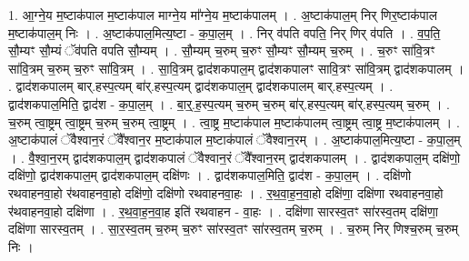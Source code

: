 \documentclass[17pt]{extarticle}
\begin{document}
1. आ॒ग्ने॒य म॒ष्टाक॑पाल म॒ष्टाक॑पाल माग्ने॒य मा᳚ग्ने॒य म॒ष्टाक॑पालम् । . अ॒ष्टाक॑पाल॒म् निर् णिर॒ष्टाक॑पाल म॒ष्टाक॑पाल॒म् निः । . अ॒ष्टाक॑पाल॒मित्य॒ष्टा - क॒पा॒ल॒म् । . निर् व॑पति वपति॒ निर् णिर् व॑पति । . व॒प॒ति॒ सौ॒म्यꣳ सौ॒म्यं ॅव॑पति वपति सौ॒म्यम् । . सौ॒म्यम् च॒रुम् च॒रुꣳ सौ॒म्यꣳ सौ॒म्यम् च॒रुम् । . च॒रुꣳ सा॑वि॒त्रꣳ सा॑वि॒त्रम् च॒रुम् च॒रुꣳ सा॑वि॒त्रम् । . सा॒वि॒त्रम् द्वाद॑शकपाल॒म् द्वाद॑शकपालꣳ सावि॒त्रꣳ सा॑वि॒त्रम् द्वाद॑शकपालम् । . द्वाद॑शकपालम् बार्.हस्प॒त्यम् बा॑र्.हस्प॒त्यम् द्वाद॑शकपाल॒म् द्वाद॑शकपालम् बार्.हस्प॒त्यम् । . द्वाद॑शकपाल॒मिति॒ द्वाद॑श - क॒पा॒ल॒म् । . बा॒र्॒.ह॒स्प॒त्यम् च॒रुम् च॒रुम् बा॑र्.हस्प॒त्यम् बा॑र्.हस्प॒त्यम् च॒रुम् । . च॒रुम् त्वा॒ष्ट्रम् त्वा॒ष्ट्रम् च॒रुम् च॒रुम् त्वा॒ष्ट्रम् । . त्वा॒ष्ट्र म॒ष्टाक॑पाल म॒ष्टाक॑पालम् त्वा॒ष्ट्रम् त्वा॒ष्ट्र म॒ष्टाक॑पालम् । . अ॒ष्टाक॑पालं ॅवैश्वान॒रं ॅवै᳚श्वान॒र म॒ष्टाक॑पाल म॒ष्टाक॑पालं ॅवैश्वान॒रम् । . अ॒ष्टाक॑पाल॒मित्य॒ष्टा - क॒पा॒ल॒म् । . वै॒श्वा॒न॒रम् द्वाद॑शकपाल॒म् द्वाद॑शकपालं ॅवैश्वान॒रं ॅवै᳚श्वान॒रम् द्वाद॑शकपालम् । . द्वाद॑शकपाल॒म् दक्षि॑णो॒ दक्षि॑णो॒ द्वाद॑शकपाल॒म् द्वाद॑शकपाल॒म् दक्षि॑णः । . द्वाद॑शकपाल॒मिति॒ द्वाद॑श - क॒पा॒ल॒म् । . दक्षि॑णो रथवाहनवा॒हो र॑थवाहनवा॒हो दक्षि॑णो॒ दक्षि॑णो रथवाहनवा॒हः । . र॒थ॒वा॒ह॒न॒वा॒हो दक्षि॑णा॒ दक्षि॑णा रथवाहनवा॒हो र॑थवाहनवा॒हो दक्षि॑णा । . र॒थ॒वा॒ह॒न॒वा॒ह इति॑ रथवाहन - वा॒हः । . दक्षि॑णा सारस्व॒तꣳ सा॑रस्व॒तम् दक्षि॑णा॒ दक्षि॑णा सारस्व॒तम् । . सा॒र॒स्व॒तम् च॒रुम् च॒रुꣳ सा॑रस्व॒तꣳ सा॑रस्व॒तम् च॒रुम् । . च॒रुम् निर् णिश्च॒रुम् च॒रुम् निः । \newline
\end{document}
